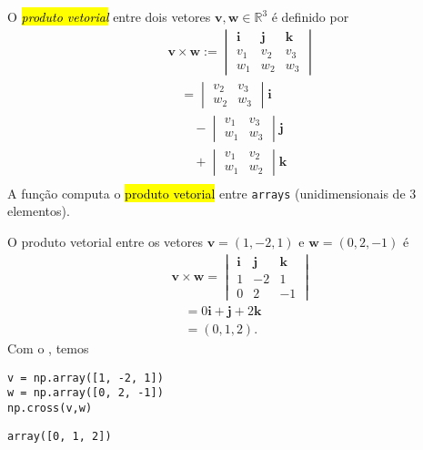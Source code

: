O \hl{\emph{produto vetorial}} entre dois vetores $\pmb{v}, \pmb{w}\in\mathbb{R}^3$ é definido por
\begin{align}
  & \pmb{v}\times\pmb{w} :=
                          \begin{vmatrix}
                            \pmb{i} & \pmb{j} & \pmb{k}\\
                            v_1 & v_2 & v_3\\
                            w_1 & w_2 & w_3
                          \end{vmatrix}\\
  & \text{}\quad =
                          \begin{vmatrix}
                            v_2 & v_3\\
                            w_2 & w_3
                          \end{vmatrix}\pmb{i}\\
  & \text{}\qquad - \begin{vmatrix}
                            v_1 & v_3\\
                            w_1 & w_3
                          \end{vmatrix}\pmb{j}\\
  & \text{}\qquad + \begin{vmatrix}
                            v_1 & v_2\\
                            w_1 & w_2
                          \end{vmatrix}\pmb{k}\\
\end{align}
A função {\PYTHONnumpyDOTcross} computa o \hl{produto vetorial} entre \texttt{arrays} (unidimensionais de 3 elementos).

\begin{ex}
  O produto vetorial entre os vetores $\pmb{v} = (1, -2, 1)$ e $\pmb{w} = (0, 2, -1)$ é
  \begin{align}
    & \pmb{v}\times \pmb{w} =
                            \begin{vmatrix}
                              \pmb{i} & \pmb{j} & \pmb{k}\\
                              1 & -2 & 1\\
                              0 & 2 & -1
                            \end{vmatrix}\\
    & \text{}\quad = 0\pmb{i} + \pmb{j} + 2\pmb{k}\\
    & \text{}\quad = (0, 1, 2).
  \end{align}
  Com o {\numpy}, temos

\begin{lstlisting}
v = np.array([1, -2, 1])
w = np.array([0, 2, -1])
np.cross(v,w)
\end{lstlisting}

\begin{verbatim}
array([0, 1, 2])
\end{verbatim}

\end{ex}


